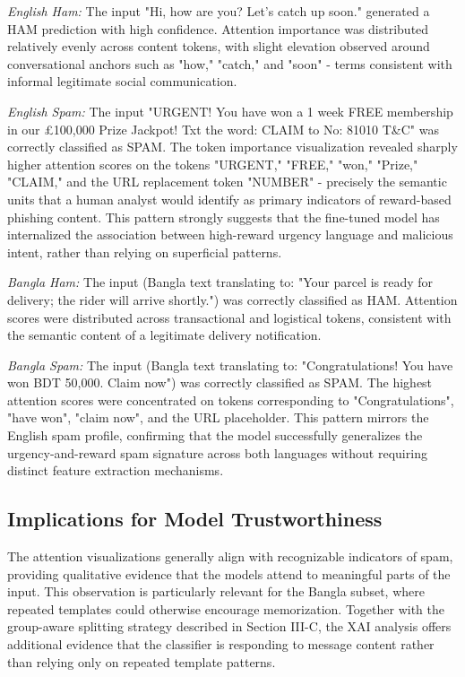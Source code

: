 \documentclass[journal]{IEEEtran}
\begin{document}
\textit{English Ham:} The input "Hi, how are you? Let's catch up soon."
generated a HAM prediction with high confidence. Attention importance
was distributed relatively evenly across content tokens, with slight
elevation observed around conversational anchors such as "how," "catch,"
and "soon" - terms consistent with informal legitimate social
communication.

\textit{English Spam:} The input "URGENT! You have won a 1 week FREE
membership in our \pounds 100,000 Prize Jackpot! Txt the word: CLAIM to No:
81010 T\&C" was correctly classified as SPAM. The token importance
visualization revealed sharply higher attention scores on the tokens
"URGENT," "FREE," "won," "Prize," "CLAIM," and the URL replacement token
"NUMBER" - precisely the semantic units that a human analyst would
identify as primary indicators of reward-based phishing content. This
pattern strongly suggests that the fine-tuned model has internalized the
association between high-reward urgency language and malicious intent,
rather than relying on superficial patterns.

\textit{Bangla Ham:} The input (Bangla text translating to: "Your parcel is ready for delivery; the rider will arrive shortly.") was correctly classified as HAM. Attention scores were distributed across transactional and logistical tokens, consistent with the semantic content of a legitimate delivery notification.

\textit{Bangla Spam:} The input (Bangla text translating to: "Congratulations! You have won BDT 50,000. Claim now") was correctly classified as SPAM. The highest attention scores were concentrated on tokens corresponding to "Congratulations", "have won", "claim now", and the URL placeholder. This pattern mirrors the English spam profile, confirming that the model successfully generalizes the urgency-and-reward spam signature across both languages without requiring distinct feature extraction mechanisms.


\subsection{Implications for Model Trustworthiness}

The attention visualizations generally align with recognizable indicators of spam, providing qualitative evidence that the models attend to meaningful parts of the input. This observation is particularly relevant for the Bangla subset, where repeated templates could otherwise encourage memorization. Together with the group-aware splitting strategy described in Section III-C, the XAI analysis offers additional evidence that the classifier is responding to message content rather than relying only on repeated template patterns.
\end{document}
